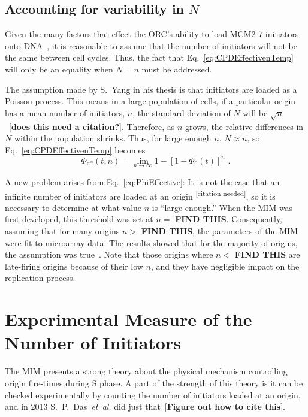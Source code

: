 {		
		\subsection{Accounting for variability in $N$}
		\label{subsec:VariableN}
		
		Given the many factors that effect the ORC's ability to load MCM2-7 initiators onto DNA~\cite{MultiMCM}, it is reasonable to assume that the number of initiators will not be the same between cell cycles.
		Thus, the fact that Eq.~\ref{eq:CPDEffectivenTemp} will only be an equality when $N=n$ must be addressed.
		
		The assumption made by S.~Yang in his thesis is that initiators are loaded as a Poisson-process.
		This means in a large population of cells, if a particular origin has a mean number of initiators, $n$, the standard deviation of $N$ will be $\sqrt{n}$~[\textbf{does this need a citation?}].
		Therefore, as $n$ grows, the relative differences in $N$ within the population shrinks.
		Thus, for large enough $n$, $N\approx n$, so Eq.~\ref{eq:CPDEffectivenTemp} becomes
		\begin{equation} \label{eq:PhiEffective}
			\Phi_{\text{eff}}(t,n) = \lim_{n\to\infty} 1 - \left[1 - \Phi_0(t)\right]^n\text{ .}
		\end{equation}
		
		A new problem arises from Eq.~\ref{eq:PhiEffective}:
		It is not the case that an infinite number of initiators are loaded at an origin \textsuperscript{[citation needed]}, so it is necessary to determine at what value $n$ is ``large enough.''
		When the MIM was first developed, this threshold was set at $n=$ \textbf{FIND THIS}.
		Consequently, assuming that for many origins $n>$ \textbf{FIND THIS}, the parameters of the MIM were fit to microarray data.
		The results showed that for the majority of origins, the assumption was true~\cite{ScottsThesis}.
		Note that those origins where $n<$ \textbf{FIND THIS} are late-firing origins because of their low $n$, and they have negligible impact on the replication process.
		
	\section{Experimental Measure of the Number of Initiators}
	\label{sec:ExperimentsMIM}
	
	The MIM presents a strong theory about the physical mechanism controlling origin fire-times during S phase.
	A part of the strength of this theory is it can be checked experimentally by counting the number of initiators loaded at an origin, and in 2013 S.~P.~Das~\emph{et~al.} did just that~[\textbf{Figure out how to cite this}].
	
}

